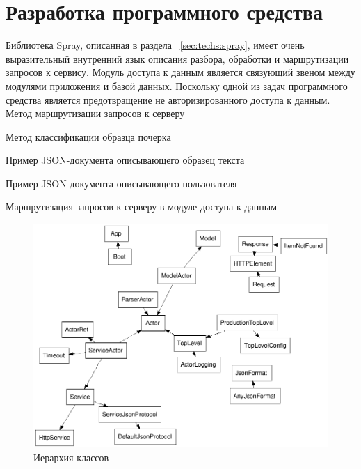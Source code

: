\section{Разработка программного средства}
Библиотека Spray, описанная в раздела ~\ref{sec:techs:spray}, имеет очень выразительный внутренний язык описания разбора, обработки и маршрутизации запросов к сервису. Модуль доступа к данным является связующий звеном между модулями приложения и базой данных. Поскольку одной из задач программного средства является предотвращение не авторизированного доступа к данным.
Метод маршрутизации запросов к серверу


Метод классификации образца почерка 


Пример JSON-документа описывающего образец текста 


Пример JSON-документа описывающего пользователя


Маршрутизация запросов к серверу в модуле доступа к данным


\begin{figure}[ht]
    \centering
    \label{fig:develoipment:class_fdp}
    \includegraphics[width=1\textwidth]{figures/classes-fdp.png}
    \caption{Иерархия классов}
\end{figure}

